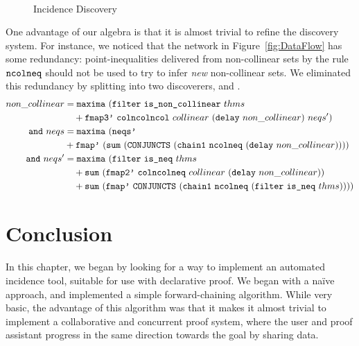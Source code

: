 \begin{figure}
\begin{align*}
\end{align*}
\caption{Incidence Discovery}
\label{fig:IncidenceDiscoveryCode}
\end{figure}

One advantage of our algebra is that it is almost trivial to refine the discovery system. For instance, we noticed that the network in Figure~\ref{fig:DataFlow} has some redundancy: point-inequalities delivered from non-collinear sets by the rule $\texttt{ncolneq}$ should not be used to try to infer \emph{new} non-collinear sets. We eliminated this redundancy by splitting  into two discoverers,  and . 
\begin{align*}
non\_collinear &= \code{maxima}\ (\code{filter}\ \code{is\_non\_collinear}\ thms\\
&\quad + \code{fmap3'}\ \code{colncolncol}\ collinear\ (\code{delay}\ non\_collinear)\ neqs')\\
\code{and}\ neqs &= \code{maxima}\ (\code{neqs'}\\
& + \code{fmap'}\ (\code{sum}\ (\code{CONJUNCTS}\ (\code{chain1}\ \code{ncolneq}\ (\code{delay}\ non\_collinear))))\\
\code{and}\ neqs' &= \code{maxima}\ (\code{filter}\ \code{is\_neq}\ thms\\
&\quad + \code{sum}\ (\code{fmap2'}\ \code{colncolneq}\ collinear\ (\code{delay}\ non\_collinear))\\
&\quad + \code{sum}\ (\code{fmap'}\ \code{CONJUNCTS}\ (\code{chain1}\ \code{ncolneq}\ (\code{filter}\ \code{is\_neq}\ thms))))
\end{align*}

\section{Conclusion}
In this chapter, we began by looking for a way to implement an automated incidence tool, suitable for use with declarative proof. We began with a na\"{i}ve approach, and implemented a simple forward-chaining algorithm. While very basic, the advantage of this algorithm was that it makes it almost trivial to implement a collaborative and concurrent proof system, where the user and proof assistant progress in the same direction towards the goal by sharing data.


